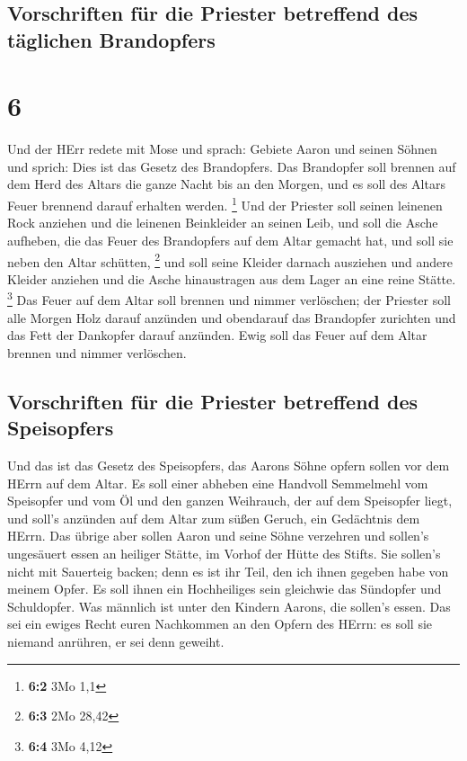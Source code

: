 \hypertarget{vorschriften-fuxfcr-die-priester-betreffend-des-tuxe4glichen-brandopfers}{%
\subsection{Vorschriften für die Priester betreffend des täglichen
Brandopfers}\label{vorschriften-fuxfcr-die-priester-betreffend-des-tuxe4glichen-brandopfers}}

\hypertarget{section-5}{%
\section{6}\label{section-5}}

 Und der HErr redete mit Mose und sprach: 
Gebiete Aaron und seinen Söhnen und sprich: Dies ist das Gesetz des
Brandopfers. Das Brandopfer soll brennen auf dem Herd des Altars die
ganze Nacht bis an den Morgen, und es soll des Altars Feuer brennend
darauf erhalten werden. \footnote{\textbf{6:2} 3Mo 1,1} 
Und der Priester soll seinen leinenen Rock anziehen und die leinenen
Beinkleider an seinen Leib, und soll die Asche aufheben, die das Feuer
des Brandopfers auf dem Altar gemacht hat, und soll sie neben den Altar
schütten, \footnote{\textbf{6:3} 2Mo 28,42}  und soll
seine Kleider darnach ausziehen und andere Kleider anziehen und die
Asche hinaustragen aus dem Lager an eine reine Stätte. \footnote{\textbf{6:4}
  3Mo 4,12}  Das Feuer auf dem Altar soll brennen und
nimmer verlöschen; der Priester soll alle Morgen Holz darauf anzünden
und obendarauf das Brandopfer zurichten und das Fett der Dankopfer
darauf anzünden.  Ewig soll das Feuer auf dem Altar
brennen und nimmer verlöschen.

\hypertarget{vorschriften-fuxfcr-die-priester-betreffend-des-speisopfers}{%
\subsection{Vorschriften für die Priester betreffend des
Speisopfers}\label{vorschriften-fuxfcr-die-priester-betreffend-des-speisopfers}}

 Und das ist das Gesetz des Speisopfers, das Aarons Söhne
opfern sollen vor dem HErrn auf dem Altar.  Es soll einer
abheben eine Handvoll Semmelmehl vom Speisopfer und vom Öl und den
ganzen Weihrauch, der auf dem Speisopfer liegt, und soll's anzünden auf
dem Altar zum süßen Geruch, ein Gedächtnis dem HErrn.  Das
übrige aber sollen Aaron und seine Söhne verzehren und sollen's
ungesäuert essen an heiliger Stätte, im Vorhof der Hütte des Stifts.
 Sie sollen's nicht mit Sauerteig backen; denn es ist ihr
Teil, den ich ihnen gegeben habe von meinem Opfer. Es soll ihnen ein
Hochheiliges sein gleichwie das Sündopfer und Schuldopfer.
 Was männlich ist unter den Kindern Aarons, die sollen's
essen. Das sei ein ewiges Recht euren Nachkommen an den Opfern des
HErrn: es soll sie niemand anrühren, er sei denn geweiht.

